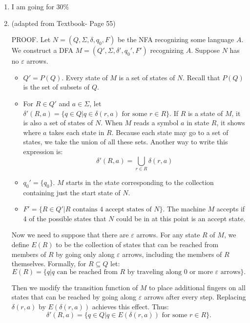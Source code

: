 \documentclass[letterpaper,12pt]{article}
\newcounter{problemid}
\def\newproblem{\clearpage\newpage{\bf Problem~\arabic{problemid}\stepcounter{problemid}}\hfill\par}
\begin{document}
\newproblem
\begin{enumerate}
    \item I am going for $30\%$
    \item 
    (adapted from Textbook- Page 55)

    PROOF. Let \(N = (Q, \Sigma, \delta, q_0, F)\) be the NFA recognizing some language \(A\). We construct a DFA \(M = (Q', \Sigma, \delta', q_0', F')\) recognizing \(A\). Suppose \(N\) has no \(\varepsilon\) arrows.

    \begin{itemize}
        \item \(Q' = P(Q)\). Every state of \(M\) is a set of states of \(N\). Recall that \(P(Q)\) is the set of subsets of \(Q\).
        
        \item For \(R \in Q'\) and \(a \in \Sigma\), let \(\delta'(R, a) = \{q \in Q | q \in \delta(r, a) \text{ for some } r \in R\}\). If \(R\) is a state of \(M\), it is also a set of states of \(N\). When \(M\) reads a symbol \(a\) in state \(R\), it shows where \(a\) takes each state in \(R\). Because each state may go to a set of states, we take the union of all these sets. Another way to write this expression is:
        \[\delta'(R, a) = \bigcup_{r \in R} \delta(r, a)\]

        \item \(q_0' = \{q_0\}\). \(M\) starts in the state corresponding to the collection containing just the start state of \(N\).

        \item \(F' = \{R \in Q' | R \text{ contains 4 accept states of } N\}\). The machine \(M\) accepts if 4 of the possible states that \(N\) could be in at this point is an accept state.
    \end{itemize}
    Now we need to suppose that there are \(\varepsilon\) arrows. For any state \(R\) of \(M\), we define \(E(R)\) to be the collection of states that can be reached from members of \(R\) by going only along \(\varepsilon\) arrows, including the members of \(R\) themselves. Formally, for \(R \subseteq Q\) let:
    \[E(R) = \{q | q \text{ can be reached from } R \text{ by traveling along 0 or more } \varepsilon \text{ arrows}\}.\]
    
    Then we modify the transition function of \(M\) to place additional fingers on all states that can be reached by going along \(\varepsilon\) arrows after every step. Replacing \(\delta(r, a)\) by \(E(\delta(r, a))\) achieves this effect. Thus:
    \[\delta'(R, a) = \{q \in Q | q \in E(\delta(r, a)) \text{ for some } r \in R\}.\]


\end{enumerate}
\end{document}
